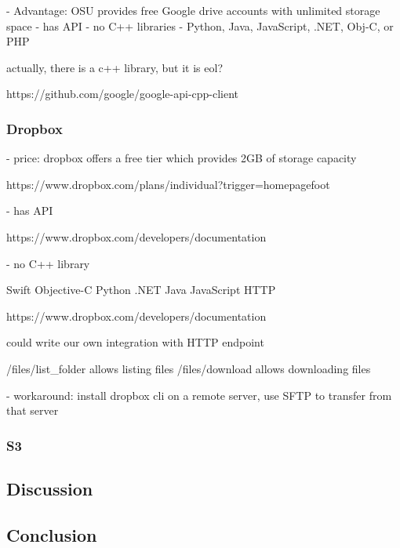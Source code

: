 \documentclass[onecolumn, draftclsnofoot,10pt, compsoc]{IEEEtran}
\begin{document}
- Advantage: OSU provides free Google drive accounts with unlimited storage space
- has API
- no C++ libraries
	- Python, Java, JavaScript, .NET, Obj-C, or PHP

actually, there is a c++ library, but it is eol?

https://github.com/google/google-api-cpp-client

\subsubsection{ Dropbox }

- price: dropbox offers a free tier which provides 2GB of storage capacity

https://www.dropbox.com/plans/individual?trigger=homepagefoot

- has API

https://www.dropbox.com/developers/documentation


- no C++ library

    Swift
    Objective-C
    Python
    .NET	
    Java
    JavaScript
    HTTP

https://www.dropbox.com/developers/documentation

could write our own integration with HTTP endpoint

/files/list\_folder allows listing files
/files/download allows downloading files



- workaround:
install dropbox cli on a remote server, use SFTP to transfer from that server

\subsubsection{ S3 }

\subsection{ Discussion }

\subsection{ Conclusion }

\newpage
{}

\end{document}
